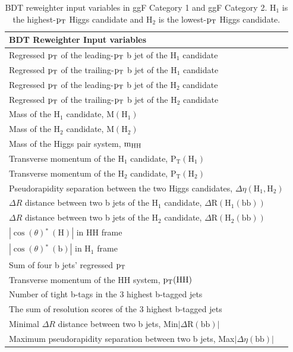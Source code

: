 \begin{table}[htbp!]
\caption[BDT reweighter input variables in ggF Category 1 and ggF Category 2]{\label{tab:ggfvarsbdtr}BDT reweighter input variables in ggF Category 1 and ggF Category 2. $\mathrm{H_{1}}$ is the highest-$\mathrm{p_{T}}$ Higgs candidate and $\mathrm{H_{2}}$ is the lowest-$\mathrm{p_{T}}$ Higgs candidate.}
\centering
\begin{tabularx}{\textwidth}{X}
    \hline
    BDT Reweighter Input variables                          \\    
    \hline
    Regressed $\mathrm{p_{T}}$ of the leading-$\mathrm{p_{T}}$ b jet of the $\mathrm{H_{1}}$ candidate  \\
    Regressed $\mathrm{p_{T}}$ of the trailing-$\mathrm{p_{T}}$ b jet of the $\mathrm{H_{1}}$ candidate \\
    Regressed $\mathrm{p_{T}}$ of the leading-$\mathrm{p_{T}}$ b jet of the $\mathrm{H_{2}}$ candidate  \\
    Regressed $\mathrm{p_{T}}$ of the trailing-$\mathrm{p_{T}}$ b jet of the $\mathrm{H_{2}}$ candidate \\
    Mass of the $\mathrm{H_{1}}$ candidate, $\mathrm{M(H_{1})}$ \\
    Mass of the $\mathrm{H_{2}}$ candidate, $\mathrm{M(H_{2})}$  \\
    Mass of the Higgs pair system, $\mathrm{m_{HH}}$  \\
    Transverse momentum of the $\mathrm{H_{1}}$ candidate, $\mathrm{P_{T}(H_{1})}$ \\
    Transverse momentum of the $\mathrm{H_{2}}$ candidate, $\mathrm{P_{T}(H_{2})}$ \\
    Pseudorapidity separation between the two Higgs candidates, $\Delta\eta\mathrm{(H_1,H_2)}$       \\   
    $\Delta R$ distance between two b jets of the $\mathrm{H_{1}}$ candidate, $\Delta\mathrm{R(H_{1}(bb))}$ \\
    $\Delta R$ distance between two b jets of the $\mathrm{H_{2}}$ candidate, $\Delta\mathrm{R(H_{2}(bb))}$  \\
    $|\mathrm{\cos}(\theta)\mathrm{^{*}~(H)}|$ in HH frame             \\      
    $|\mathrm{\cos}(\theta)\mathrm{^{*}~(b)}|$ in $\mathrm{H_{1}}$ frame        \\
    Sum of four b jets' regressed $\mathrm{p_{T}}$                                        \\
    Transverse momentum of the HH system, $\mathrm{\mathrm{p_{T}}(HH)}$           \\
    Number of tight b-tags in the 3 highest b-tagged jets                        \\
    The sum of resolution scores of the 3 highest b-tagged jets                  \\
    Minimal $\Delta R$ distance between two b jets, Min$|\Delta\mathrm{R(bb)}|$                               \\
    Maximum pseudorapidity separation between two b jets, Max$|\Delta\eta\mathrm{(bb)}|$             \\
    \hline
\end{tabularx}
\end{table}

